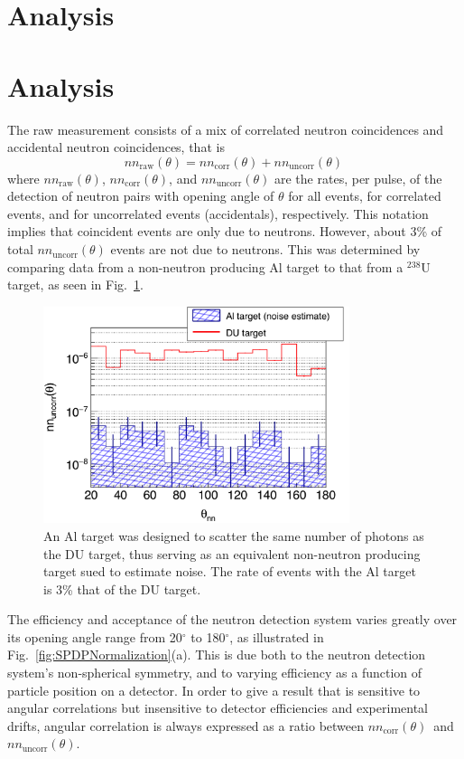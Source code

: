 \section{Analysis}
\label{Analysis}
\section{Analysis}
The raw measurement consists of a mix of correlated neutron coincidences and accidental neutron coincidences, that is
\begin{equation}
\label{eq:corr_uncorr}
nn_{\text{raw}}(\theta)= nn_{\text{corr}}(\theta) + nn_{\text{uncorr}}(\theta) \,
\end{equation}
where $nn_{\text{raw}}(\theta)$,  $nn_{\text{corr}}(\theta)$, and $nn_{\text{uncorr}}(\theta)$ are the rates, per pulse, of the detection of neutron pairs with opening angle of $\theta$ for all events, for correlated events, and for uncorrelated events (accidentals), respectively.
This notation implies that coincident events are only due to neutrons.
However, about 3\% of total  $nn_{\text{uncorr}}(\theta)$ events are not due to neutrons.
This was determined by comparing data from a non-neutron producing Al target to that from a $^{238}$U target, as seen in Fig.~\ref{fig:Noise}.
\begin{figure}[]
\centering
    \includegraphics[width=0.8\textwidth]{Content/Methods/Noise.png}
    \caption{An Al target was designed to scatter the same number of photons as the DU target, thus serving as an equivalent non-neutron producing target sued to estimate noise.
    The rate of events with the Al target is 3\% that of the DU target. 
        }
    \label{fig:Noise}
\end{figure}

The efficiency and acceptance of the neutron detection system varies greatly over its opening angle range from 20$^{\circ}$ to 180$^{\circ}$, as illustrated in Fig.~\ref{fig:SPDPNormalization}(a).
This is due both to the neutron detection system's non-spherical symmetry, and to varying efficiency as a function of particle position on a detector.
In order to give a result that is sensitive to angular correlations but insensitive to detector efficiencies and experimental drifts, angular correlation is always expressed as a ratio between $nn_{\text{corr}}(\theta)$~and~$nn_{\text{uncorr}}(\theta)$.

